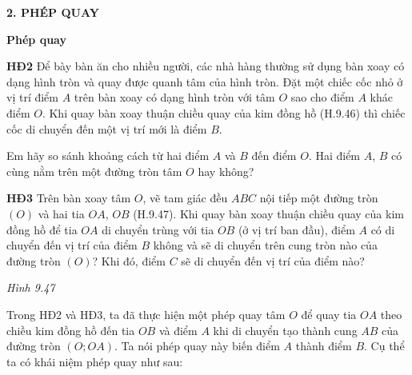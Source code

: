 \begin{lesson}
    \answerline

    \textbf{2. PHÉP QUAY}

    \textbf{Phép quay}

    \textbf{HĐ2} Để bày bàn ăn cho nhiều người, các nhà hàng thường sử dụng bàn xoay có dạng hình tròn và quay được quanh tâm của hình tròn. Đặt một chiếc cốc nhỏ ở vị trí điểm $A$ trên bàn xoay có dạng hình tròn với tâm $O$ sao cho điểm $A$ khác điểm $O$. Khi quay bàn xoay thuận chiều quay của kim đồng hồ (H.9.46) thì chiếc cốc di chuyển đến một vị trí mới là điểm $B$.


    Em hãy so sánh khoảng cách từ hai điểm $A$ và $B$ đến điểm $O$. Hai điểm $A$, $B$ có cùng nằm trên một đường tròn tâm $O$ hay không?

    \answerline

    \textbf{HĐ3} Trên bàn xoay tâm $O$, vẽ tam giác đều $ABC$ nội tiếp một đường tròn $(O)$ và hai tia $OA$, $OB$ (H.9.47). Khi quay bàn xoay thuận chiều quay của kim đồng hồ để tia $OA$ di chuyển trùng với tia $OB$ (ở vị trí ban đầu), điểm $A$ có di chuyển đến vị trí của điểm $B$ không và sẽ di chuyển trên cung tròn nào của đường tròn $(O)$? Khi đó, điểm $C$ sẽ di chuyển đến vị trí của điểm nào?

    \begin{center}

        \textit{Hình 9.47}
    \end{center}

    \answerline
    \answerline

    Trong HĐ2 và HĐ3, ta đã thực hiện một phép quay tâm $O$ để quay tia $OA$ theo chiều kim đồng hồ đến tia $OB$ và điểm $A$ khi di chuyển tạo thành cung $AB$ của đường tròn $(O;OA)$. Ta nói phép quay này biến điểm $A$ thành điểm $B$. Cụ thể ta có khái niệm phép quay như sau:


\end{lesson}
